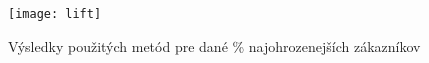 \begin{figure}[H]
\begin{center}
\texttt{[image: lift]}\end{center}
\caption[lift]{Výsledky použitých metód pre dané \% najohrozenejších zákazníkov}\label{fig:lift}
\end{figure}




\begin{comment}
\section{Časť}
\label{sec:Časť}
V tejto časti sa venujeme 
\begin{figure}[H]
\begin{center}\texttt{[image: figure]}\end{center}
\caption[Name figure]{Name figure}\label{fig:figure}
\end{figure}

\subsection{Číslovaný zoznam}
\begin{my_enumerate}
	\item {cieľ 1}
	\begin{my_enumerate}
		\item {cieľ 1.a}
		\item {cieľ 1.b}
	\end{my_enumerate}
	\item {cieľ 2}
	\item {cieľ 3}
\end{my_enumerate}

\subsection{Citácia}
Lorem ipsum dolor sit amet, consectetuer adipiscing elit, sed diam nonummy nibh euismod tincidunt ut laoreet dolore magna aliquam erat volutpat~\cite{1}.


\end{comment}
